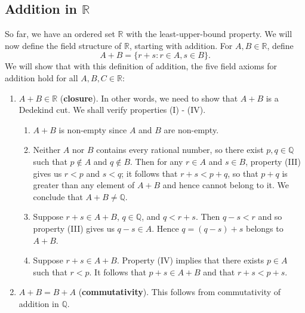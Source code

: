 \documentclass[12pt]{article}
\theoremstyle{definition}
\begin{document}
\subsection{Addition in \texorpdfstring{\(\mathbb{R}\)}{}}
\label{sec:addition_in_R}

So far, we have an ordered set \( \mathbb{R} \) with the least-upper-bound property. We will now define the field structure of \( \mathbb{R} \), starting with addition. For \( A, B \in \mathbb{R} \), define
\[
    A + B = \{ r + s : r \in A, s \in B \}.
\]
We will show that with this definition of addition, the five field axioms for addition hold for all \( A, B, C \in \mathbb{R} \):

\begin{enumerate}[label = (A\arabic*)]
    \item \( A + B \in \mathbb{R} \) (\textbf{closure}). In other words, we need to show that \( A + B \) is a Dedekind cut. We shall verify properties (I) - (IV).
    
    \begin{enumerate}[label = (\Roman*)]
        \item \( A + B \) is non-empty since \( A \) and \( B \) are non-empty.
        
        \item Neither \( A \) nor \( B \) contains every rational number, so there exist \( p, q \in \mathbb{Q} \) such that \( p \not\in A \) and \( q \not\in B \). Then for any \( r \in A \) and \( s \in B \), property (III) gives us \( r < p \) and \( s < q \); it follows that \( r + s < p + q \), so that \( p + q \) is greater than any element of \( A + B \) and hence cannot belong to it. We conclude that \( A + B \neq \mathbb{Q} \).
        
        \item Suppose \( r + s \in A + B \), \( q \in \mathbb{Q} \), and \( q < r + s \). Then \( q - s < r \) and so property (III) gives us \( q - s \in A \). Hence \( q = (q - s) + s \) belongs to \( A + B \).
        
        \item Suppose \( r + s \in A + B \). Property (IV) implies that there exists \( p \in A \) such that \( r < p \). It follows that \( p + s \in A + B \) and that \( r + s < p + s \).
    \end{enumerate}
    
    \item \( A + B = B + A \) (\textbf{commutativity}). This follows from commutativity of addition in \( \mathbb{Q} \).
    

\end{enumerate}
\end{document}
